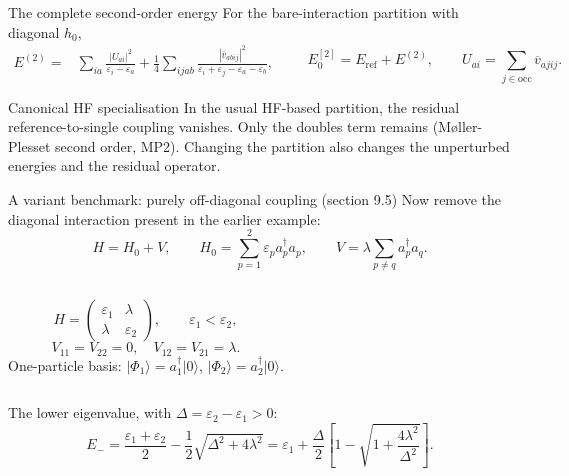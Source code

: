 \documentclass[aspectratio=169,10pt]{beamer}
\newcommand{\ket}[1]{\vert #1\rangle}
\newcommand{\cre}[1]{a_{#1}^{\dagger}}
\newcommand{\ann}[1]{a_{#1}}
\newcommand{\vbar}[4]{\overline v_{#1#2#3#4}}
\newcommand{\Eref}{E_{\mathrm{ref}}}
\begin{document}
\begin{frame}{The complete second-order energy}
For the bare-interaction partition with diagonal \(h_0\),
\[
\boxed{\begin{aligned}
E^{(2)}={}&\sum_{ia}\frac{|U_{ai}|^2}{\varepsilon_i-\varepsilon_a}
+\frac14\sum_{ijab}
\frac{|\vbar{a}{b}{i}{j}|^2}
 {\varepsilon_i+\varepsilon_j-\varepsilon_a-\varepsilon_b},
\end{aligned}}
\qquad
E_0^{[2]}=\Eref+E^{(2)},\qquad
U_{ai}=\sum_{j\in\mathrm{occ}}\vbar{a}{j}{i}{j}.
\]
\begin{exampleblock}{Canonical HF specialisation}
In the usual HF-based partition, the residual reference-to-single coupling vanishes. Only the doubles term remains (M\o{}ller-Plesset second order, MP2). Changing the partition also changes the unperturbed energies and the residual operator.
\end{exampleblock}
\end{frame}

\begin{frame}{A variant benchmark: purely off-diagonal coupling (section 9.5)}
Now remove the diagonal interaction present in the earlier example:
\[
H=H_0+V,\qquad H_0=\sum_{p=1}^{2}\varepsilon_p\cre{p}\ann{p},
\qquad V=\lambda\sum_{p\ne q}\cre{p}\ann{q}.
\]
\begin{columns}[c,onlytextwidth]
\centering
{}
\[
H=\begin{pmatrix}\varepsilon_1&\lambda\\\lambda&\varepsilon_2\end{pmatrix},
\qquad \varepsilon_1<\varepsilon_2,
\]
\[
V_{11}=V_{22}=0,\quad V_{12}=V_{21}=\lambda.
\]
\small One-particle basis: \(\ket{\Phi_1}=\cre{1}\ket{0}\), \(\ket{\Phi_2}=\cre{2}\ket{0}\).
\end{columns}
\vspace{0.5em}
The lower eigenvalue, with \(\Delta=\varepsilon_2-\varepsilon_1>0\):
\[
\boxed{E_-=
\frac{\varepsilon_1+\varepsilon_2}{2}
-\frac12\sqrt{\Delta^2+4\lambda^2}
=\varepsilon_1+\frac\Delta2
\left[1-\sqrt{1+\frac{4\lambda^2}{\Delta^2}}\right].}
\]
\end{frame}
\end{document}

